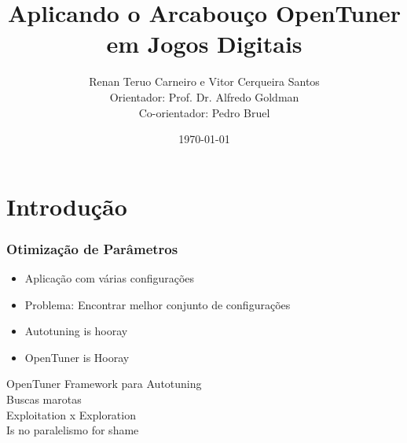 \documentclass[10pt]{beamer}
\title{Aplicando o Arcabouço OpenTuner em Jogos Digitais}
\date{\today}
\author{Renan Teruo Carneiro e Vitor Cerqueira Santos\\
	Orientador: Prof. Dr. Alfredo Goldman\\
    Co-orientador: Pedro Bruel}
\institute{Instituto de Matemática e Estatística}
\begin{document}
\maketitle


\section{Introdução}

\begin{frame}[fragile]
	\frametitle{Otimização de Parâmetros}
	  \begin{itemize}[<+- | alert@+>]
	  	\item Aplicação com várias configurações
	  	\item Problema: Encontrar melhor conjunto de configurações
	  	\item Autotuning is hooray
	  	\item OpenTuner is Hooray
	  \end{itemize}
\end{frame}

\begin{frame}{OpenTuner}
	Framework para Autotuning\pause\\
	Buscas marotas\pause\\
	Exploitation x Exploration\pause\\
	Is no paralelismo for shame
\end{frame}
%
%  
%
%
\end{document}
